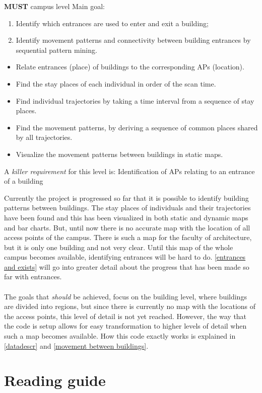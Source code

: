 \textbf{MUST} campus level
Main goal: 
\begin{enumerate}
\item Identify which entrances are used to enter and exit a building;
\item Identify movement patterns and connectivity between building entrances by sequential pattern mining.
\end{enumerate}
\begin{itemize}
\item Relate entrances (place) of buildings to the corresponding APs (location).
\item Find the stay places of each individual in order of the scan time.
\item Find individual trajectories by taking a time interval from a sequence of stay places.
\item Find the movement patterns, by deriving a sequence of common places shared by all trajectories.
\item Visualize the movement patterns between buildings in static maps.
\end{itemize}
A \textit{killer requirement} for this level is:
Identification of APs relating to an entrance of a building

Currently the project is progressed so far that it is possible to identify building patterns between buildings. The stay places of individuals and their trajectories have been found and this has been visualized in both static and dynamic maps and bar charts. But, until now there is no accurate map with the location of all access points of the campus. There is such a map for the faculty of architecture, but it is only one building and not very clear. Until this map of the whole campus becomes available, identifying entrances will be hard to do. \autoref{entrances and exists} will go into greater detail about the progress that has been made so far with entrances. \\\\
The goals that \textit {should} be achieved, focus on the building level, where buildings are divided into regions, but since there is currently no map with the locations of the access points, this level of detail is not yet reached. However, the way that the code is setup allows for easy transformation to higher levels of detail when such a map becomes available. How this code exactly works is explained in \autoref{datadescr} and \autoref{movement between buildings}. 

\section{Reading guide}

